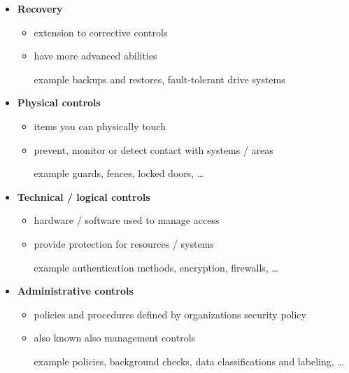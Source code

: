 \documentclass[11pt,twoside,landscape]{article}
\begin{document}
\begin{multicols}{4}
\begin{itemize}
\item \textbf{Recovery}
\begin{itemize}
\item extension to corrective controls
\item have more advanced abilities
\item[{example}] backups and restores, fault-tolerant drive systems
\end{itemize}
\end{itemize}


\begin{itemize}
\item \textbf{Physical controls}
\begin{itemize}
\item items you can physically touch
\item prevent, monitor or detect contact with systems / areas
\item[{example}] guards, fences, locked doors, \ldots{}
\end{itemize}

\item \textbf{Technical / logical controls}
\begin{itemize}
\item hardware / software used to manage access
\item provide protection for resources / systems
\item[{example}] authentication methods, encryption, firewalls, \ldots{}
\end{itemize}

\item \textbf{Administrative controls}
\begin{itemize}
\item policies and procedures defined by organizations security policy
\item also known also management controls
\item[{example}] policies, background checks, data classifications and labeling, \ldots{}
\end{itemize}
\end{itemize}


\end{multicols}
\end{document}
